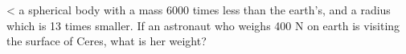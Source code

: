  <%
a spherical body with a mass 6000 times less than the
earth's, and a radius which is 13 times smaller.  If an
astronaut who weighs 400 N on earth is visiting the
surface of Ceres, what is her weight?
